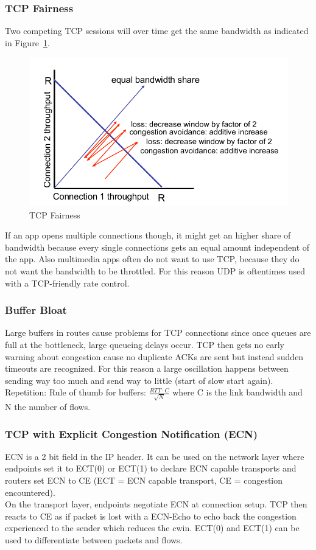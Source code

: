 \subsubsection*{TCP Fairness}
Two competing TCP sessions will over time get the same bandwidth as indicated in Figure~\ref{fig:tcp_fairness}.
\begin{figure}[h]
  \centering
  \includegraphics[width=.6\textwidth]{figures/tcp_fairness.png}
  \caption{TCP Fairness}\label{fig:tcp_fairness}
\end{figure}
If an app opens multiple connections though, it might get an higher share of bandwidth because every single connections gets an equal amount independent of the app.
Also multimedia apps often do not want to use TCP, because they do not want the bandwidth to be throttled.
For this reason UDP is oftentimes used with a TCP-friendly rate control.

\subsubsection*{Buffer Bloat}
Large buffers in routes cause problems for TCP connections since once queues are full at the bottleneck, large queueing delays occur.
TCP then gets no early warning about congestion cause no duplicate ACKs are sent but instead sudden timeouts are recognized.
For this reason a large oscillation happens between sending way too much and send way to little (start of slow start again).
Repetition: Rule of thumb for buffers: $\frac{RTT \cdot C}{\sqrt{N}}$ where C is the link bandwidth and N the number of flows.

\subsubsection*{TCP with Explicit Congestion Notification (ECN)}
ECN is a 2 bit field in the IP header.
It can be used on the network layer where endpoints set it to ECT(0) or ECT(1) to declare ECN capable transports and routers set ECN to CE (ECT = ECN capable transport, CE = congestion encountered).\\
On the transport layer, endpoints negotiate ECN at connection setup.
TCP then reacts to CE as if packet is lost with a ECN-Echo to echo back the congestion experienced to the sender which reduces the cwin.
ECT(0) and ECT(1) can be used to differentiate between packets and flows.

